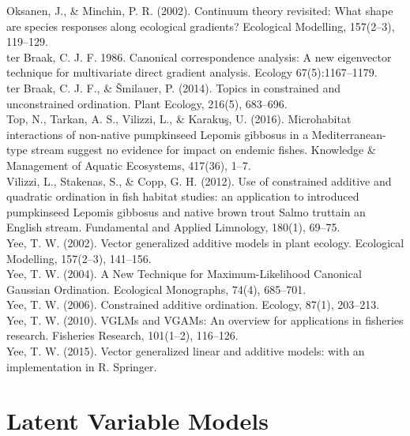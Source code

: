 \documentclass{article}
\begin{document}
Oksanen, J., \& Minchin, P. R. (2002). Continuum theory revisited: What shape are species responses along ecological gradients? Ecological Modelling, 157(2–3), 119–129.\\

ter Braak, C. J. F. 1986. Canonical correspondence analysis: A new eigenvector technique for multivariate direct gradient analysis. Ecology 67(5):1167–1179.\\ 

ter Braak, C. J. F., \& Šmilauer, P. (2014). Topics in constrained and unconstrained ordination. Plant Ecology, 216(5), 683–696.\\ 

Top, N., Tarkan, A. S., Vilizzi, L., \& Karakuş, U. (2016). Microhabitat interactions of non-native pumpkinseed Lepomis gibbosus in a Mediterranean-type stream suggest no evidence for impact on endemic fishes. Knowledge \& Management of Aquatic Ecosystems, 417(36), 1–7.\\


Vilizzi, L., Stakenas, S., \& Copp, G. H. (2012). Use of constrained additive and quadratic ordination in fish habitat studies: an application to introduced pumpkinseed Lepomis gibbosus and native brown trout Salmo truttain an English stream. Fundamental and Applied Limnology, 180(1), 69–75. \\

Yee, T. W. (2002). Vector generalized additive models in plant ecology. Ecological Modelling, 157(2–3), 141–156.\\

Yee, T. W. (2004). A New Technique for Maximum-Likelihood Canonical Gaussian Ordination. Ecological Monographs, 74(4), 685–701.\\

Yee, T. W. (2006). Constrained additive ordination. Ecology, 87(1), 203–213. \\

Yee, T. W. (2010). VGLMs and VGAMs: An overview for applications in fisheries research. Fisheries Research, 101(1–2), 116–126. \\

Yee, T. W. (2015). Vector generalized linear and additive models: with an implementation in R. Springer.\\

\section{Latent Variable Models}
\end{document}
